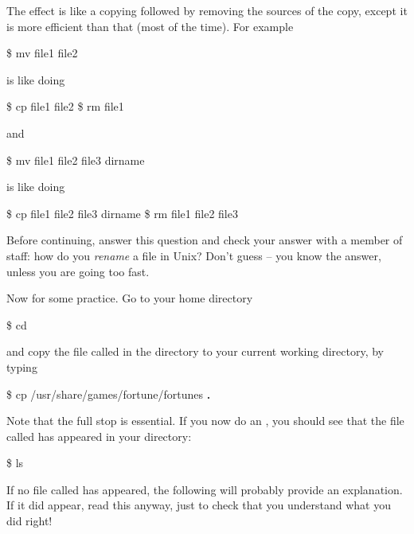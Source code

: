 The effect is like a copying followed by removing the sources of the copy,
except it is more efficient than that (most of the time).
For example
\begin{ttoutenv}
\$  mv file1 file2 \return
\end{ttoutenv}
is like doing
\begin{ttoutenv}
\$  cp file1 file2 \return
\$  rm file1
\end{ttoutenv}
and
\begin{ttoutenv}
\$  mv file1 file2 file3 dirname \return
\end{ttoutenv}
is like doing
\begin{ttoutenv}
\$  cp file1 file2 file3 dirname \return
\$  rm file1 file2 file3
\end{ttoutenv}

Before continuing, answer this question and check your answer with a
member of staff: how do you \emph{rename} a file in Unix? Don't guess -- you
know the answer, unless you are going too fast.

Now for some practice. Go to your home directory
%
\begin{ttoutenv}
\$  cd \return
\end{ttoutenv}
%
and copy the file called  in the 
directory to your current working directory, by typing

\begin{ttoutenv}
\$  cp /usr/share/games/fortune/fortunes \textbf{.}  \return
\end{ttoutenv}
%
Note that the full stop is
essential.  If you now do an , you should see that the
file called  has appeared in your directory:

\begin{ttoutenv}
\$  ls \return
\end{ttoutenv}

If no file called  has appeared, the following will
probably provide an explanation. If it did appear, read this anyway, just to
check that you understand what you did right!

